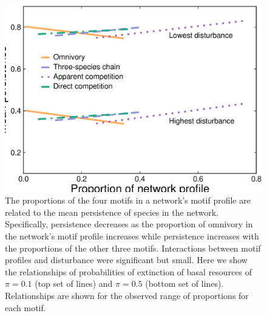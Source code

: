\documentclass[12pt]{article}
\begin{document}
\begin{spacing}{2.0}
    \begin{figure}[hb!]
        \centering
        \includegraphics[width=\textwidth]{figures/persistence_motif_profiles.eps}
        \caption{The proportions of the four motifs in a network's motif profile are related to the mean persistence of species in the network. Specifically, persistence decreases as the proportion of omnivory in the network's motif profile increases while persistence increases with the proportions of the other three motifs. Interactions between motif profiles and disturbance were significant but small. Here we show the relationships of probabilities of extinction of basal resources of $\pi=0.1$ (top set of lines) and $\pi=0.5$ (bottom set of lines). Relationships are shown for the observed range of proportions for each motif.}      
        \label{fig:motif_profile_persistence}
    \end{figure}    
    

\end{spacing}
\end{document}
